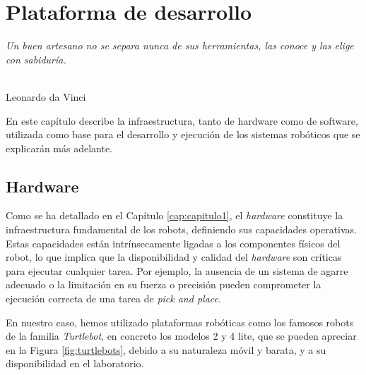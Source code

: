 \chapter{Plataforma de desarrollo}
\label{cap:capitulo3}

\begin{flushright}
\begin{minipage}[]{10cm}
\emph{Un buen artesano no se separa nunca de sus herramientas, las conoce y las elige con sabiduría.}\\
\end{minipage}\\

Leonardo da Vinci\\
\end{flushright}

\vspace{1cm}


En este capítulo describe la infraestructura, tanto de hardware como de
software, utilizada como base para el desarrollo y ejecución de los sistemas
robóticos que se explicarán más adelante.

\section{Hardware}
\label{sec:hardware}

Como se ha detallado en el Capítulo \ref{cap:capitulo1}, el \textit{hardware}
constituye la infraestructura fundamental de los robots, definiendo sus
capacidades operativas.
Estas capacidades están intrínsecamente ligadas a los componentes físicos del
robot, lo que implica que la disponibilidad y calidad del \textit{hardware} son
críticas para ejecutar cualquier tarea.
Por ejemplo, la ausencia de un sistema de agarre adecuado o la limitación en su
fuerza o precisión pueden comprometer la ejecución correcta de una tarea de
\textit{pick and place}.

En nuestro caso, hemos utilizado plataformas robóticas como los famosos robots
de la familia \textit{Turtlebot}, en concreto los modelos 2 y 4 lite, que se
pueden apreciar en la Figura \ref{fig:turtlebots}, debido a su naturaleza móvil
y barata, y a su disponibilidad en el laboratorio.

